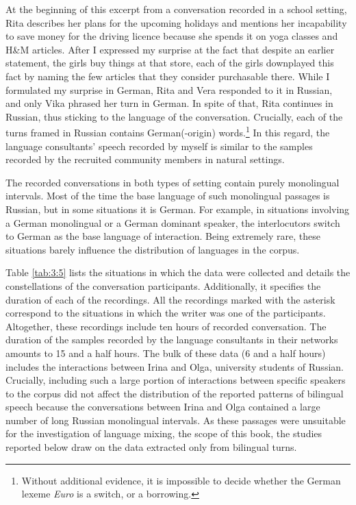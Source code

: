 \noindent{}At the beginning of this excerpt from a conversation recorded in a school setting, Rita describes her plans for the upcoming holidays and mentions her incapability to save  money for the driving licence because she spends it on yoga classes and H{\&}M articles. After I expressed my surprise at the fact that despite an earlier statement, the girls buy things at that store, each of the girls downplayed this fact by naming the few articles that they consider purchasable there. While I formulated my surprise in German, Rita and Vera responded to it in Russian, and only Vika phrased her turn in German. In spite of that, Rita continues in Russian, thus sticking to the language of the conversation. Crucially, each of the turns framed in Russian contains German(-origin) words.\footnote{Without additional evidence, it is impossible to decide whether the German lexeme \textit{Euro} is a switch, or a borrowing.} In this regard, the language consultants' speech recorded by myself is similar to the samples recorded by the recruited community members in natural settings.

The recorded conversations in both types of setting contain purely monolingual intervals. Most of the time the base language of such monolingual passages is Russian, but in some situations it is German. For example, in situations involving a German monolingual or a German dominant speaker, the interlocutors switch to German as the base language of interaction. Being extremely rare, these situations barely influence the distribution of languages in the corpus.

Table \ref{tab:3:5} lists the situations in which the data were collected and details the constellations of the conversation participants. Additionally, it specifies the duration of each of the recordings. All the recordings marked with the asterisk correspond to the situations in which the writer was one of the participants. Altogether, these recordings include ten hours of recorded conversation. The duration of the samples recorded by the language consultants in their networks amounts to 15 and a half hours. The bulk of these data (6 and a half hours) includes the interactions between Irina and Olga, university students of Russian. Crucially, including such a large portion of interactions between specific speakers to the corpus did not affect the distribution of the reported patterns of bilingual speech because the conversations between Irina and Olga contained a large number of long Russian monolingual intervals. As these passages were unsuitable for the investigation of language mixing, the scope of this book, the studies reported below draw on the data extracted only from bilingual turns.

